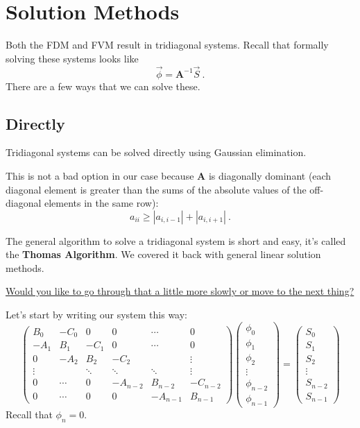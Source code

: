 \documentclass[12pt]{article}
\newcommand{\ve}[1]{\ensuremath{\mathbf{#1}}}
\begin{document}
\section{Solution Methods}

Both the FDM and FVM result in tridiagonal systems. Recall that formally solving these systems looks like
\[\vec{\phi} = \ve{A}^{-1}\vec{S} \:.\]
There are a few ways that we can solve these. 

\subsection{Directly}

Tridiagonal systems can be solved directly using Gaussian elimination. 

This is not a bad option in our case because $\ve{A}$ is diagonally dominant (each diagonal element is greater than the sums of the absolute values of the off-diagonal elements in the same row):
\[a_{ii} \geq |a_{i,i-1}| + |a_{i, i+1}|\:.\] 

The general algorithm to solve a tridiagonal system is short and easy, it's called the \textbf{Thomas Algorithm}. We covered it back with general linear solution methods. 

\underline{Would you like to go through that a little more slowly or move to the next thing?}

Let's start by writing our system this way:
%
\begin{equation}
\begin{pmatrix}
B_0  & -C_0 & 0    & 0    & \cdots & 0 \\
-A_1 & B_1  & -C_1 & 0    & \cdots & 0 \\
0    & -A_2 & B_2  & -C_2 & & \vdots \\
\vdots        &    & \ddots  & \ddots & \ddots & \vdots \\
0 & \cdots & 0 & -A_{n-2} & B_{n-2} & -C_{n-2} \\
0        & \cdots   & 0   & 0 & -A_{n-1} & B_{n-1} 
\end{pmatrix}
%
\begin{pmatrix}\phi_0 \\ \phi_1 \\ \phi_2 \\ \vdots \\ \phi_{n-2} \\ \phi_{n-1} \end{pmatrix} =
%
\begin{pmatrix}S_0 \\ S_1 \\ S_2 \\ \vdots \\ S_{n-2} \\ S_{n-1} \end{pmatrix}
\end{equation}
%
Recall that $\phi_n = 0$. 
\end{document}
